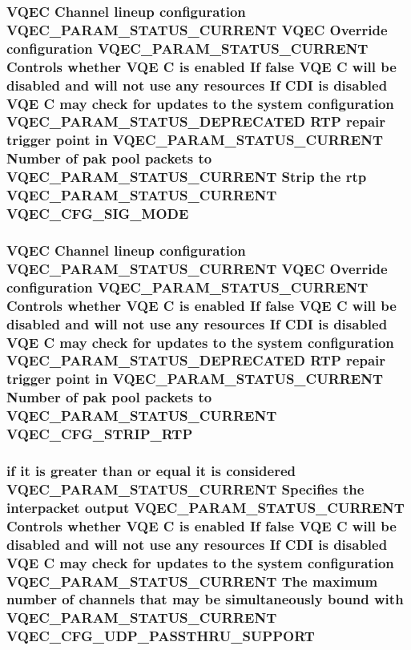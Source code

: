 \subsubsection{\setlength{\rightskip}{0pt plus 5cm}VQEC Channel lineup configuration VQEC\_\-PARAM\_\-STATUS\_\-CURRENT VQEC Override configuration VQEC\_\-PARAM\_\-STATUS\_\-CURRENT Controls whether VQE \bf{C} is enabled If false VQE \bf{C} will be disabled and will not use any resources If CDI is disabled VQE \bf{C} may check for updates \bf{to} the system configuration VQEC\_\-PARAM\_\-STATUS\_\-DEPRECATED RTP repair trigger point in VQEC\_\-PARAM\_\-STATUS\_\-CURRENT Number of pak pool packets \bf{to} VQEC\_\-PARAM\_\-STATUS\_\-CURRENT Strip the rtp VQEC\_\-PARAM\_\-STATUS\_\-CURRENT \bf{VQEC\_\-CFG\_\-SIG\_\-MODE}}\label{vqec__cfg__settings_8h_45e57048dddace3cfc51d7e830b7f879}


\subsubsection{\setlength{\rightskip}{0pt plus 5cm}VQEC Channel lineup configuration VQEC\_\-PARAM\_\-STATUS\_\-CURRENT VQEC Override configuration VQEC\_\-PARAM\_\-STATUS\_\-CURRENT Controls whether VQE \bf{C} is enabled If false VQE \bf{C} will be disabled and will not use any resources If CDI is disabled VQE \bf{C} may check for updates \bf{to} the system configuration VQEC\_\-PARAM\_\-STATUS\_\-DEPRECATED RTP repair trigger point in VQEC\_\-PARAM\_\-STATUS\_\-CURRENT Number of pak pool packets \bf{to} VQEC\_\-PARAM\_\-STATUS\_\-CURRENT \bf{VQEC\_\-CFG\_\-STRIP\_\-RTP}}\label{vqec__cfg__settings_8h_24dbbb8d6a2df355043aabfbc01b995d}


\subsubsection{\setlength{\rightskip}{0pt plus 5cm}if it is greater than or equal it is considered VQEC\_\-PARAM\_\-STATUS\_\-CURRENT Specifies the interpacket output VQEC\_\-PARAM\_\-STATUS\_\-CURRENT Controls whether VQE \bf{C} is enabled If false VQE \bf{C} will be disabled and will not use any resources If CDI is disabled VQE \bf{C} may check for updates \bf{to} the system configuration VQEC\_\-PARAM\_\-STATUS\_\-CURRENT The maximum number of \bf{channels} that may be simultaneously bound with VQEC\_\-PARAM\_\-STATUS\_\-CURRENT \bf{VQEC\_\-CFG\_\-UDP\_\-PASSTHRU\_\-SUPPORT}}\label{vqec__cfg__settings_8h_c6dba96cafff0ecd66f3e0e39c6423a8}


